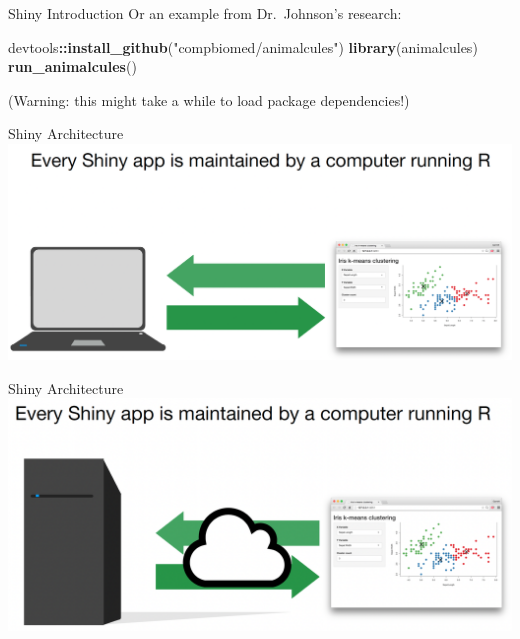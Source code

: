 \documentclass[
  ignorenonframetext,
]{beamer}
\newenvironment{Shaded}{\begin{snugshade}}{\end{snugshade}}
\newcommand{\FunctionTok}[1]{\textcolor[rgb]{0.13,0.29,0.53}{\textbf{#1}}}
\newcommand{\NormalTok}[1]{#1}
\newcommand{\SpecialCharTok}[1]{\textcolor[rgb]{0.81,0.36,0.00}{\textbf{#1}}}
\newcommand{\StringTok}[1]{\textcolor[rgb]{0.31,0.60,0.02}{#1}}
\begin{document}
\begin{frame}[fragile]{Shiny Introduction}
\label{shiny-introduction-1}
Or an example from Dr.~Johnson's research:

\begin{Shaded}
\begin{Highlighting}[]
\NormalTok{devtools}\SpecialCharTok{::}\FunctionTok{install\_github}\NormalTok{(}\StringTok{"compbiomed/animalcules"}\NormalTok{)}
\FunctionTok{library}\NormalTok{(animalcules)}
\FunctionTok{run\_animalcules}\NormalTok{()}
\end{Highlighting}
\end{Shaded}

(Warning: this might take a while to load package dependencies!)
\end{frame}

\begin{frame}{Shiny Architecture}
\label{shiny-architecture}
\includegraphics{shinyfigs/shiny_arch_1.png}
\end{frame}

\begin{frame}{Shiny Architecture}
\label{shiny-architecture-1}
\includegraphics{shinyfigs/shiny_arch_2.png}
\end{frame}
\end{document}
